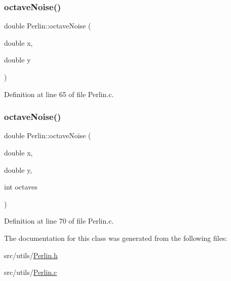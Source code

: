 \subsubsection{\texorpdfstring{octaveNoise()}{octaveNoise()}\hspace{0.1cm}{\footnotesize\ttfamily [1/2]}}
{\footnotesize\ttfamily double Perlin\+::octave\+Noise (\begin{DoxyParamCaption}\item[{double}]{x,  }\item[{double}]{y }\end{DoxyParamCaption})}



Definition at line 65 of file Perlin.\+c.

\mbox{\label{class_world_architect_1_1_perlin_ac3dd81a7e37765c1ec13930cce207d56}} 
\subsubsection{\texorpdfstring{octaveNoise()}{octaveNoise()}\hspace{0.1cm}{\footnotesize\ttfamily [2/2]}}
{\footnotesize\ttfamily double Perlin\+::octave\+Noise (\begin{DoxyParamCaption}\item[{double}]{x,  }\item[{double}]{y,  }\item[{int}]{octaves }\end{DoxyParamCaption})}



Definition at line 70 of file Perlin.\+c.



The documentation for this class was generated from the following files\+:\begin{DoxyCompactItemize}
\item 
src/utils/\mbox{\hyperlink{_perlin_8h}{Perlin.\+h}}\item 
src/utils/\mbox{\hyperlink{_perlin_8c}{Perlin.\+c}}\end{DoxyCompactItemize}
